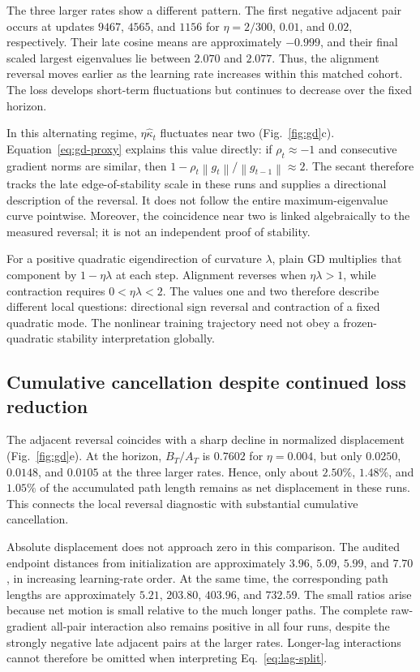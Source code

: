 \documentclass[11pt]{article}
\newcommand{\norm}[1]{\left\lVert#1\right\rVert}
\begin{document}
The three larger rates show a different pattern. The first negative adjacent
pair occurs at updates $9467$, $4565$, and $1156$ for $\eta=2/300$, $0.01$, and
$0.02$, respectively. Their late cosine means are approximately $-0.999$,
and their final scaled largest eigenvalues lie between $2.070$ and $2.077$.
Thus, the alignment reversal moves earlier as the learning rate increases
within this matched cohort. The loss develops short-term fluctuations but
continues to decrease over the fixed horizon.

In this alternating regime, $\eta\widehat\kappa_t$ fluctuates near two
(Fig.~\ref{fig:gd}c). Equation~\eqref{eq:gd-proxy} explains this value directly:
if $\rho_t\approx-1$ and consecutive gradient norms are similar, then
$1-\rho_t\norm{g_t}/\norm{g_{t-1}}\approx2$. The secant therefore tracks the
late edge-of-stability scale in these runs and supplies a directional
description of the reversal. It does not follow the entire maximum-eigenvalue
curve pointwise. Moreover, the coincidence near two is linked algebraically
to the measured reversal; it is not an independent proof of stability.

For a positive quadratic eigendirection of curvature $\lambda$, plain GD
multiplies that component by $1-\eta\lambda$ at each step. Alignment reverses
when $\eta\lambda>1$, while contraction requires $0<\eta\lambda<2$.
The values one and two therefore describe different local questions:
directional sign reversal and contraction of a fixed quadratic mode. The
nonlinear training trajectory need not obey a frozen-quadratic stability
interpretation globally.


\clearpage

\subsection{Cumulative cancellation despite continued loss reduction}

The adjacent reversal coincides with a sharp decline in normalized displacement
(Fig.~\ref{fig:gd}e). At the horizon, $B_T/A_T$ is $0.7602$ for $\eta=0.004$,
but only $0.0250$, $0.0148$, and $0.0105$ at the three larger rates. Hence,
only about $2.50\%$, $1.48\%$, and $1.05\%$ of the accumulated path length
remains as net displacement in these runs. This connects the local reversal
diagnostic with substantial cumulative cancellation.

Absolute displacement does not approach zero in this comparison. The audited
endpoint distances from initialization are approximately $3.96$, $5.09$,
$5.99$, and $7.70$, in increasing learning-rate order. At the same time, the
corresponding path lengths are approximately $5.21$, $203.80$, $403.96$, and
$732.59$. The small ratios arise because net motion is small relative to the
much longer paths. The complete raw-gradient all-pair interaction also remains
positive in all four runs, despite the strongly negative late adjacent pairs
at the larger rates. Longer-lag interactions cannot therefore be omitted when
interpreting Eq.~\eqref{eq:lag-split}.
\end{document}
